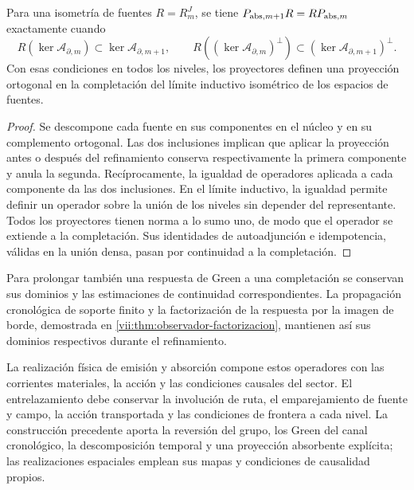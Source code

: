 \begin{proposition}
\label{vii:prop:naturalidad-proyeccion-absorcion}
Para una isometría de fuentes \(R=R_m^J\), se tiene
\(P_{{\rm abs},m+1}R=RP_{{\rm abs},m}\) exactamente cuando
\[
 R(\ker\mathcal A_{\partial,m})
       \subset\ker\mathcal A_{\partial,m+1},\qquad
 R((\ker\mathcal A_{\partial,m})^\perp)
       \subset(\ker\mathcal A_{\partial,m+1})^\perp.
\]
Con esas condiciones en todos los niveles, los proyectores definen una
proyección ortogonal en la completación del límite inductivo isométrico
de los espacios de fuentes.
\end{proposition}
\begin{proof}
Se descompone cada fuente en sus componentes en el núcleo y en su
complemento ortogonal. Las dos inclusiones implican que aplicar la
proyección antes o después del refinamiento conserva respectivamente la
primera componente y anula la segunda. Recíprocamente, la igualdad de
operadores aplicada a cada componente da las dos inclusiones.
En el límite inductivo, la igualdad permite definir un operador sobre la
unión de los niveles sin depender del representante. Todos los proyectores
tienen norma a lo sumo uno, de modo que el operador se extiende a la
completación. Sus identidades de autoadjunción e idempotencia, válidas en
la unión densa, pasan por continuidad a la completación.
\end{proof}

Para prolongar también una respuesta de Green a una completación se
conservan sus dominios y las estimaciones de continuidad correspondientes.
La propagación cronológica de soporte finito y la factorización de la
respuesta por la imagen de borde, demostrada en
\ref{vii:thm:observador-factorizacion}, mantienen así sus dominios
respectivos durante el refinamiento.

La realización física de emisión y absorción compone estos operadores con
las corrientes materiales, la acción y las condiciones causales del sector.
El entrelazamiento debe conservar la involución de ruta, el emparejamiento
de fuente y campo, la acción transportada y las condiciones de frontera a
cada nivel. La construcción precedente aporta la reversión del grupo, los
Green del canal cronológico, la descomposición temporal y una proyección
absorbente explícita; las realizaciones espaciales emplean sus mapas y
condiciones de causalidad propios.
